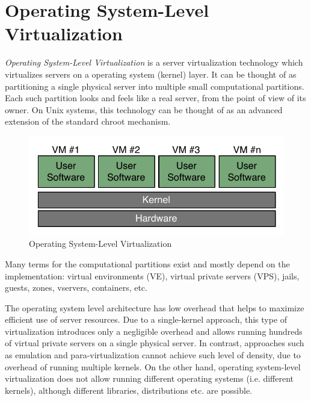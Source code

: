 \section{Operating System-Level Virtualization}

\textit{Operating System-Level Virtualization} is a server virtualization
technology which virtualizes servers on a operating system (kernel) layer. It
can be thought of as partitioning a single physical server into multiple small
computational partitions. Each such partition looks and feels like a real
server, from the point of view of its owner. On Unix systems, this technology
can be thought of as an advanced extension of the standard chroot mechanism.

\begin{figure}[H]
	\center
	\includegraphics[scale=0.75]{intro/os-virtualization}
	\caption{Operating System-Level Virtualization}
\end{figure}

Many terms for the computational partitions exist and mostly depend on the
implementation: virtual environments (VE), virtual private servers (VPS),
jails, guests, zones, vservers, containers, etc.

The operating system level architecture has low overhead that helps to maximize
efficient use of server resources. Due to a single-kernel approach, this type
of virtualization introduces only a negligible overhead and allows running
hundreds of virtual private servers on a single physical server. In contrast,
approaches such as emulation and para-virtualization cannot achieve such level
of density, due to overhead of running multiple kernels. On the other hand,
operating system-level virtualization does not allow running different
operating systems (i.e. different kernels), although different libraries,
distributions etc. are possible.~\cite{wp-os-virt}
